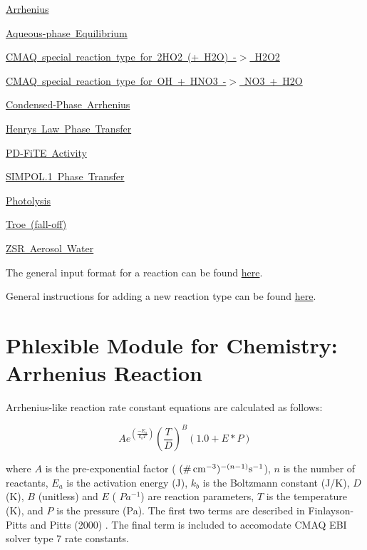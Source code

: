\begin{DoxyItemize}
\item \mbox{\hyperlink{phlex_rxn_arrhenius}{Arrhenius}}
\item \mbox{\hyperlink{phlex_rxn_aqueous_equilibrium}{Aqueous-\/phase Equilibrium}}
\item \mbox{\hyperlink{phlex_rxn_CMAQ_H2O2}{C\+M\+AQ special reaction type for 2\+H\+O2 (+ H2O) -\/$>$ H2\+O2}}
\item \mbox{\hyperlink{phlex_rxn_CMAQ_OH_HNO3}{C\+M\+AQ special reaction type for OH + H\+N\+O3 -\/$>$ N\+O3 + H2O}}
\item \mbox{\hyperlink{phlex_rxn_condensed_phase_arrhenius}{Condensed-\/\+Phase Arrhenius}}
\item \mbox{\hyperlink{phlex_rxn_HL_phase_transfer}{Henry\textquotesingle{}s Law Phase Transfer}}
\item \mbox{\hyperlink{phlex_rxn_PDFiTE_activity}{P\+D-\/\+Fi\+TE Activity}}
\item \mbox{\hyperlink{phlex_rxn_SIMPOL_phase_transfer}{S\+I\+M\+P\+OL.1 Phase Transfer}}
\item \mbox{\hyperlink{phlex_rxn_photolysis}{Photolysis}}
\item \mbox{\hyperlink{phlex_rxn_troe}{Troe (fall-\/off)}}
\item \mbox{\hyperlink{phlex_rxn_ZSR_aerosol_water}{Z\+SR Aerosol Water}}
\end{DoxyItemize}

The general input format for a reaction can be found \mbox{\hyperlink{input_format_rxn}{here}}.

General instructions for adding a new reaction type can be found \mbox{\hyperlink{phlex_rxn_add}{here}}. \hypertarget{phlex_rxn_arrhenius}{}\section{Phlexible Module for Chemistry\+: Arrhenius Reaction}\label{phlex_rxn_arrhenius}
Arrhenius-\/like reaction rate constant equations are calculated as follows\+:

\[ Ae^{(\frac{-E_a}{k_bT})}(\frac{T}{D})^B(1.0+E*P) \]

where $A$ is the pre-\/exponential factor ( $(\mbox{\si{\#.cm^{-3}}})^{-(n-1)}\mbox{\si{\per\second}}$), $n$ is the number of reactants, $E_a$ is the activation energy (J), $k_b$ is the Boltzmann constant (J/K), $D$ (K), $B$ (unitless) and $E$ ( $Pa^{-1}$) are reaction parameters, $T$ is the temperature (K), and $P$ is the pressure (Pa). The first two terms are described in Finlayson-\/\+Pitts and Pitts (2000) \cite{Finlayson-Pitts2000} . The final term is included to accomodate C\+M\+AQ E\+BI solver type 7 rate constants.

